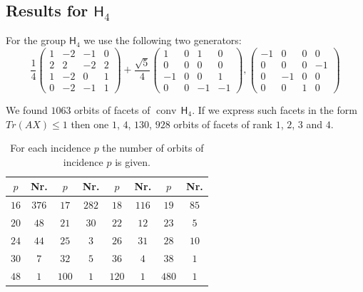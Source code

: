 \documentclass[12pt]{amsart}
\DeclareMathOperator{\conv}{conv}
\begin{document}
\subsection{Results for $\mathsf{H}_4$}
For the group $\mathsf{H}_4$ we use the following two generators:
\begin{equation*}
\frac{1}{4}\left(\begin{array}{cccc}
1 & -2 & -1 & 0\\
2 & 2 & -2 & 2\\
1 & -2 & 0 & 1\\
0 & -2 & -1 & 1
\end{array}\right)
+\frac{\sqrt{5} }{4}\left(\begin{array}{cccc}
1 & 0 & 1 & 0\\
0 & 0 & 0 & 0\\
-1 & 0 & 0 & 1\\
0 & 0 & -1 & -1
\end{array}\right)
,\left(\begin{array}{cccc}
-1 & 0 & 0 & 0\\
0 & 0 & 0 & -1\\
0 & -1 & 0 & 0\\
0 & 0 & 1 & 0
\end{array}\right)
\end{equation*}

We found $1063$ orbits of facets of $\conv\,\mathsf{H}_4$.
If we express such facets in the form $Tr(AX)\leq 1$ then one $1$, $4$, $130$, $928$ orbits of facets of rank $1$, $2$, $3$ and $4$.


\begin{table}
\begin{center}
\begin{tabular}{|cc|cc|cc|cc|}
\hline
$p$  & Nr.      &    $p$  & Nr.      &    $p$  & Nr.      &    $p$  & Nr.\\\hline
$16$ & $376$    &    $17$ & $282$    &    $18$ & $116$    &    $19$ & $85$\\
$20$ & $48$    &    $21$ & $30$    &    $22$ & $12$    &    $23$ & $5$\\
$24$ & $44$    &    $25$ & $3$    &    $26$ & $31$    &    $28$ & $10$\\
$30$ & $7$    &    $32$ & $5$    &    $36$ & $4$    &    $38$ & $1$\\
$48$ & $1$    &    $100$ & $1$    &    $120$ & $1$    &    $480$ & $1$\\
\hline
\end{tabular}
\caption{For each incidence $p$ the number of orbits of incidence $p$ is given.}\label{Tab_Incidence}
\end{center}
\end{table}
\end{document}
